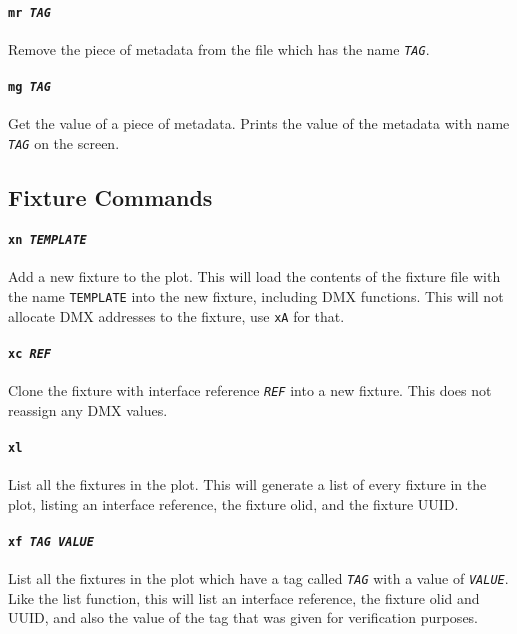 \documentclass[a4paper]{article}
\begin{document}
\paragraph{\texttt{mr \textit{TAG}}}
Remove the piece of metadata from the file which has the name 
\texttt{\textit{TAG}}.

\paragraph{\texttt{mg \textit{TAG}}}
Get the value of a piece of metadata. Prints the value of the metadata with
name \texttt{\textit{TAG}} on the screen.

\subsection{Fixture Commands}

\paragraph{\texttt{xn \textit{TEMPLATE}}}
Add a new fixture to the plot. This will load the contents of the fixture 
file with the name \texttt{TEMPLATE} into the new fixture, including DMX 
functions. This will not allocate DMX addresses to the fixture, use 
\texttt{xA} for that.

\paragraph{\texttt{xc \textit{REF}}}
Clone the fixture with interface reference \texttt{\textit{REF}} into a new 
fixture. This does not reassign any DMX values.

\paragraph{\texttt{xl}}
List all the fixtures in the plot. This will generate a list of every fixture 
in the plot, listing an interface reference, the fixture olid, and the fixture 
UUID.

\paragraph{\texttt{xf \textit{TAG VALUE}}}
List all the fixtures in the plot which have a tag called 
\texttt{\textit{TAG}} with a value of \texttt{\textit{VALUE}}. Like the list 
function, this will list an interface reference, the fixture olid and UUID, 
and also the value of the tag that was given for verification purposes.
\end{document}
